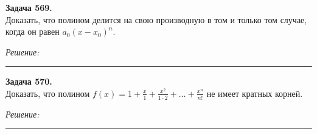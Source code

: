 \documentclass[a4paper, 12pt]{article}
\newenvironment{problem}[2][Задача]
    { \begin{mdframed}[backgroundcolor=gray!10] \textbf{#1 #2.} \\}
    {  \end{mdframed}}
\newenvironment{solution}
    {\textit{Решение: }}
    {\noindent\rule{7in}{1.5pt}}
\begin{document}
\begin{problem}{569}
Доказать, что полином делится на свою производную в том и только том случае, когда он равен $a_0(x-x_0)^n$.
\end{problem}
\begin{solution}



\end{solution}

\begin{problem}{570}
Доказать, что полином $f(x)=1+\frac{x}{1}+\frac{x^2}{1\cdot 2}+\ldots +\frac{x^n}{n!}$ не имеет кратных корней.
\end{problem}
\begin{solution}



\end{solution}
\end{document}
